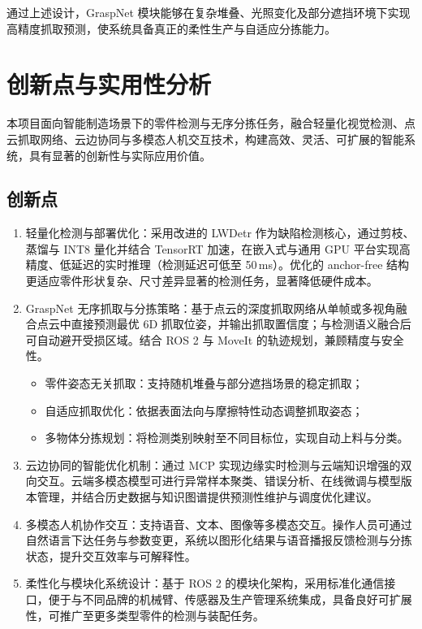 \documentclass{cumcmthesis}
\begin{document}
通过上述设计，GraspNet 模块能够在复杂堆叠、光照变化及部分遮挡环境下实现高精度抓取预测，使系统具备真正的柔性生产与自适应分拣能力。


\section{创新点与实用性分析}

本项目面向智能制造场景下的零件检测与无序分拣任务，融合轻量化视觉检测、点云抓取网络、云边协同与多模态人机交互技术，构建高效、灵活、可扩展的智能系统，具有显著的创新性与实际应用价值。

\subsection{创新点}

\begin{enumerate}
    \item 轻量化检测与部署优化：采用改进的 LWDetr 作为缺陷检测核心，通过剪枝、蒸馏与 INT8 量化并结合 TensorRT 加速，在嵌入式与通用 GPU 平台实现高精度、低延迟的实时推理（检测延迟可低至 50\,ms）。优化的 anchor-free 结构更适应零件形状复杂、尺寸差异显著的检测任务，显著降低硬件成本。
    \item GraspNet 无序抓取与分拣策略：基于点云的深度抓取网络从单帧或多视角融合点云中直接预测最优 6D 抓取位姿，并输出抓取置信度；与检测语义融合后可自动避开受损区域。结合 ROS 2 \cite{quigley2009ros} 与 MoveIt\cite{sucan2012open} 的轨迹规划，兼顾精度与安全性。
    \begin{itemize}
        \item 零件姿态无关抓取：支持随机堆叠与部分遮挡场景的稳定抓取；
        \item 自适应抓取优化：依据表面法向与摩擦特性动态调整抓取姿态；
        \item 多物体分拣规划：将检测类别映射至不同目标位，实现自动上料与分类。
    \end{itemize}
    \item 云边协同的智能优化机制：通过 MCP 实现边缘实时检测与云端知识增强的双向交互。云端多模态模型可进行异常样本聚类、错误分析、在线微调与模型版本管理，并结合历史数据与知识图谱提供预测性维护与调度优化建议。
    \item 多模态人机协作交互：支持语音、文本、图像等多模态交互。操作人员可通过自然语言下达任务与参数变更，系统以图形化结果与语音播报反馈检测与分拣状态，提升交互效率与可解释性。
    \item 柔性化与模块化系统设计：基于 ROS 2 的模块化架构，采用标准化通信接口，便于与不同品牌的机械臂、传感器及生产管理系统集成，具备良好可扩展性，可推广至更多类型零件的检测与装配任务。
\end{enumerate}
\end{document}
